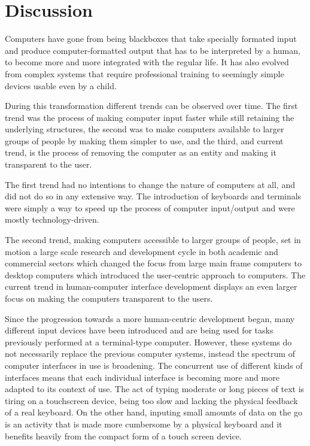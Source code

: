 \section{Discussion}


Computers have gone from being blackboxes that take specially formated input and produce computer-formatted output that has to be interpreted by a human, to become more and more integrated with the regular life. It has also evolved from complex systems that require professional training to seemingly simple devices usable even by a child.

During this transformation different trends can be observed over time. The first trend was the process of making computer input faster while still retaining the underlying structures, the second was to make computers available to larger groups of people by making them simpler to use, and the third, and current trend, is the process of removing the computer as an entity and making it transparent to the user.

The first trend had no intentions to change the nature of computers at all, and did not do so in any extensive way. The introduction of keyboards and terminals were simply a way to speed up the process of computer input/output and were mostly technology-driven. 

The second trend, making computers accessible to larger groups of people, set in motion a large scale research and development cycle in both academic and commercial sectors which changed the focus from large main frame computers to desktop computers which introduced the user-centric approach to computers. The current trend in human-computer interface development displays an even larger focus on making the computers transparent to the users.

Since the progression towards a more human-centric development began, many different input devices have been introduced and are being used for tasks previously performed at a terminal-type computer. However, these systems do not necessarily replace the previous computer systems, instead the spectrum of computer interfaces in use is broadening. The concurrent use of different kinds of interfaces means that each individual interface is becoming more and more adapted to its context of use. The act of typing moderate or long pieces of text is tiring on a touchscreen device, being too slow and lacking the physical feedback of a real keyboard. On the other hand, inputing small amounts of data on the go is an activity that is made more cumbersome by a physical keyboard and it benefits heavily from the compact form of a touch screen device.


